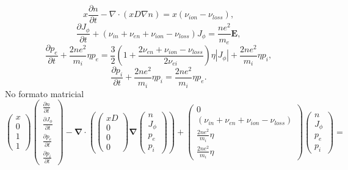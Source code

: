 \documentclass[12pt,oneside,a4paper]{abntex2}
\begin{document}
\begin{equation}
x \frac{\partial n}{\partial t} - \nabla \cdot \left( x D \nabla n \right) = x ( \nu_{ion} - \nu_{loss} ) ,
\end{equation}
\begin{equation}
\frac{\partial J_\phi}{\partial t} +(\nu_{in}+\nu_{en}+\nu_{ion}-\nu_{loss}) J_\phi =  \frac{ne^2}{m_e} \bm{E} ,
\end{equation}
\begin{equation}
\frac{\partial p_e}{\partial t} + \frac{2ne^2}{m_i} \eta p_e = \frac{3}{2}(1+\frac{2 \nu_{en} + \nu_{ion} - \nu_{loss}}{2\nu_{ei}})\eta |J_\phi|  +\frac{2ne^2}{m_i} \eta p_i,
\end{equation}
\begin{equation}
\frac{\partial p_i}{\partial t} + \frac{2ne^2}{m_i} \eta p_i = \frac{2ne^2}{m_i}\eta p_e .
\end{equation}
No formato matricial
\begin{displaymath}
\left(\begin{array}{c}
x \\
0\\
1\\
1
\end{array}\right)
\left(\begin{array}{c}
\frac{\partial n}{\partial t}\\
\frac{\partial J_\phi}{\partial t}\\
\frac{\partial p_e}{\partial t}\\
\frac{\partial p_i}{\partial t}
\end{array}\right) - \bm{\nabla} \cdot \left( \left(\begin{array}{c}
x D\\
0\\
0\\
0
\end{array}\right) \bm{\nabla} \left(\begin{array}{c}
n\\
J_\phi\\
p_e\\
p_i
\end{array}\right) \right) + \left(\begin{array}{c}
0\\
(\nu_{in}+\nu_{en}+\nu_{ion}-\nu_{loss})\\
\frac{2ne^2}{m_i} \eta\\
\frac{2ne^2}{m_i} \eta
\end{array}\right)\left(\begin{array}{c}
n\\
J_\phi\\
p_e\\
p_i
\end{array}\right) =
\end{displaymath}
\end{document}
